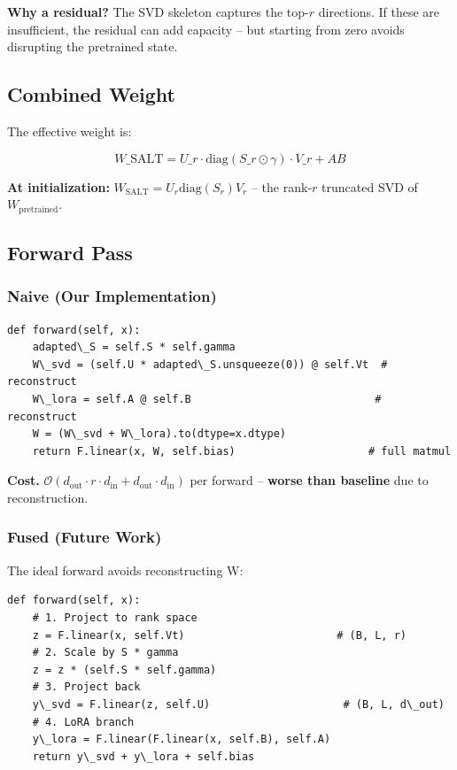 \textbf{Why a residual?} The SVD skeleton captures the top-$r$ directions. If 
these are insufficient, the residual can add capacity -- but starting from 
zero avoids disrupting the pretrained state.

\subsection{Combined Weight}

The effective weight is:

\[
W\_\text{SALT} = U\_r \cdot \text{diag}(S\_r \odot \gamma) \cdot V\_r + A B
\tag{4.5}
\]

\textbf{At initialization:} $W_\text{SALT} = U_r \text{diag}(S_r) V_r$ -- the 
rank-$r$ truncated SVD of $W_\text{pretrained}$.

\subsection{Forward Pass}

\subsubsection{Naive (Our Implementation)}

\begin{lstlisting}
def forward(self, x):
    adapted\_S = self.S * self.gamma
    W\_svd = (self.U * adapted\_S.unsqueeze(0)) @ self.Vt  # reconstruct
    W\_lora = self.A @ self.B                             # reconstruct
    W = (W\_svd + W\_lora).to(dtype=x.dtype)
    return F.linear(x, W, self.bias)                     # full matmul
\end{lstlisting}

\textbf{Cost.} $\mathcal{O}(d_\text{out} \cdot r \cdot d_\text{in} + d_\text{out} \cdot d_\text{in})$ 
per forward -- \textbf{worse than baseline} due to reconstruction.

\subsubsection{Fused (Future Work)}

The ideal forward avoids reconstructing W:

\begin{lstlisting}
def forward(self, x):
    # 1. Project to rank space
    z = F.linear(x, self.Vt)                        # (B, L, r)
    # 2. Scale by S * gamma
    z = z * (self.S * self.gamma)
    # 3. Project back
    y\_svd = F.linear(z, self.U)                     # (B, L, d\_out)
    # 4. LoRA branch
    y\_lora = F.linear(F.linear(x, self.B), self.A)
    return y\_svd + y\_lora + self.bias
\end{lstlisting}

